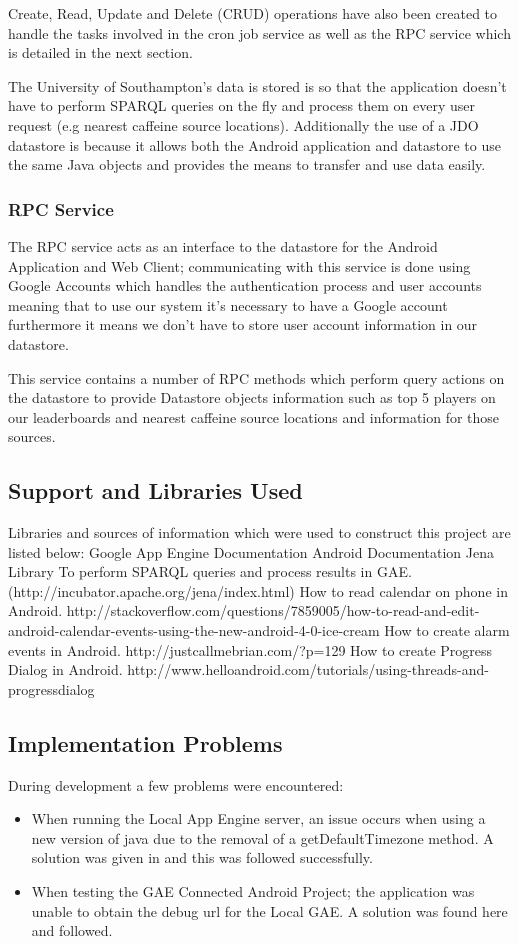 Create, Read, Update and Delete (CRUD) operations have also been created to handle the tasks involved in the cron job service as well as the RPC service which is detailed in the next section.

The University of Southampton's data is stored is so that the application doesn't have to perform SPARQL queries on the fly and process them on every user request (e.g nearest caffeine source locations). Additionally the use of a JDO datastore is because it allows both the Android application and datastore to use the same Java objects and provides the means to transfer and use data easily.

\subsubsection{RPC Service}
The RPC service acts as an interface to the datastore for the Android Application and Web Client; communicating with this service is done using Google Accounts which handles the authentication process and user accounts meaning that to use our system it's necessary to have a Google account furthermore it means we don't have to store user account information in our datastore. 

This service contains a number of RPC methods which perform query actions on the datastore to provide Datastore objects information such as top 5 players on our leaderboards and nearest caffeine source locations and information for those sources.

\subsection{Support and Libraries Used}
Libraries and sources of information which were used to construct this project are listed below:
Google App Engine Documentation
Android Documentation
Jena Library 
To perform SPARQL queries and process results in GAE.
(http://incubator.apache.org/jena/index.html)
How to read calendar on phone in Android.
http://stackoverflow.com/questions/7859005/how-to-read-and-edit-android-calendar-events-using-the-new-android-4-0-ice-cream
How to create alarm events in Android.
http://justcallmebrian.com/?p=129
How to create Progress Dialog in Android.
http://www.helloandroid.com/tutorials/using-threads-and-progressdialog

\subsection{Implementation Problems}
During development a few problems were encountered:
\begin{itemize}
	\item{When running the Local App Engine server, an issue occurs when using a new version of java due to the removal of a getDefaultTimezone method. A solution was given in \cite{solution} and this was followed successfully.}
	\item{When testing the GAE Connected Android Project; the application was unable to obtain the debug url for the Local GAE. A solution was found here \cite{solution2} and followed.}
\end{itemize}
